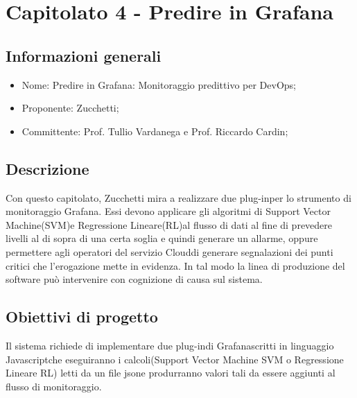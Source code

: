 \section{Capitolato 4 - Predire in Grafana}

\subsection{Informazioni generali}
\begin{itemize}
	\item Nome: Predire in Grafana\glo: Monitoraggio predittivo per DevOps\glo;
	\item Proponente: Zucchetti;
	\item Committente: Prof. Tullio Vardanega e Prof. Riccardo Cardin;
\end{itemize}

\subsection{Descrizione}
Con questo capitolato, Zucchetti mira a realizzare due plug-in\glosp per lo strumento di monitoraggio Grafana\glo. Essi devono applicare gli algoritmi di Support Vector Machine(SVM)\glosp e Regressione Lineare(RL)\glosp al flusso di dati al fine di prevedere livelli al di sopra di una certa soglia e quindi generare un allarme, oppure permettere agli operatori del servizio Cloud\glosp di generare segnalazioni dei punti critici che l’erogazione mette in evidenza. In tal modo la linea di produzione del software può intervenire con cognizione di causa sul sistema.

\subsection{Obiettivi di progetto}
Il sistema richiede di implementare due plug-in\glosp di Grafana\glosp scritti in linguaggio Javascript\glosp che eseguiranno i calcoli(Support Vector Machine SVM o Regressione Lineare RL) letti da un file json\glosp e produrranno valori tali da essere aggiunti al flusso di monitoraggio.


